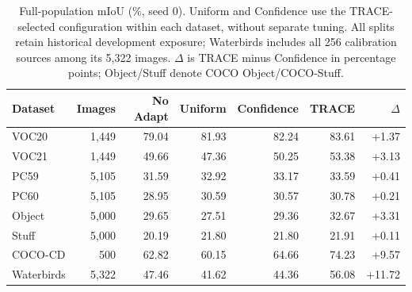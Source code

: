 \begin{table}[t]
\caption{Full-population mIoU (\%, seed 0). Uniform and Confidence use the TRACE-selected configuration within each dataset, without separate tuning. All splits retain historical development exposure; Waterbirds includes all 256 calibration sources among its 5,322 images. $\Delta$ is TRACE minus Confidence in percentage points; Object/Stuff denote COCO Object/COCO-Stuff.}
\label{tab:tuned-full-comparison}
\centering\small
\begin{tabular}{@{}lrrrrrr@{}}
\toprule
Dataset & Images & No Adapt & Uniform & Confidence & TRACE & $\Delta$ \\
\midrule
VOC20 & 1,449 & 79.04 & 81.93 & 82.24 & 83.61 & +1.37 \\
VOC21 & 1,449 & 49.66 & 47.36 & 50.25 & 53.38 & +3.13 \\
PC59 & 5,105 & 31.59 & 32.92 & 33.17 & 33.59 & +0.41 \\
PC60 & 5,105 & 28.95 & 30.59 & 30.57 & 30.78 & +0.21 \\
Object & 5,000 & 29.65 & 27.51 & 29.36 & 32.67 & +3.31 \\
Stuff & 5,000 & 20.19 & 21.80 & 21.80 & 21.91 & +0.11 \\
COCO-CD & 500 & 62.82 & 60.15 & 64.66 & 74.23 & +9.57 \\
Waterbirds & 5,322 & 47.46 & 41.62 & 44.36 & 56.08 & +11.72 \\
\bottomrule
\end{tabular}
\end{table}
